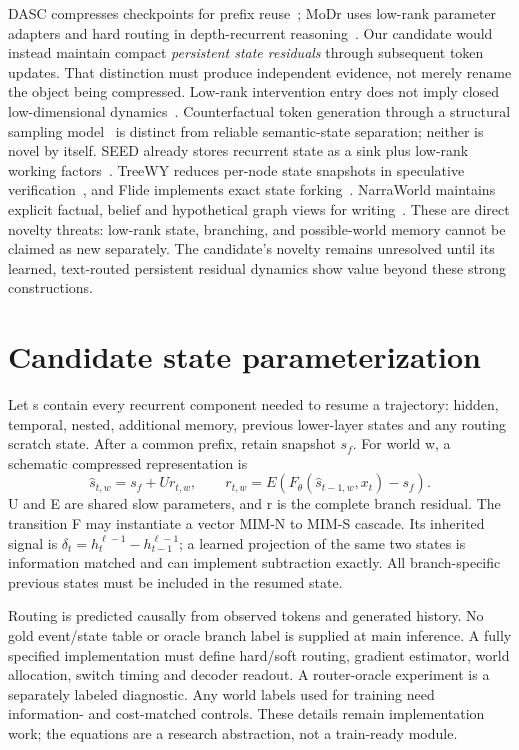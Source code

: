 \documentclass[11pt,a4paper]{article}
\begin{document}
DASC compresses checkpoints for prefix reuse~\cite{dasc}; MoDr uses low-rank
parameter adapters and hard routing in depth-recurrent reasoning~\cite{modr}.
Our candidate would instead maintain compact \emph{persistent state residuals}
through subsequent token updates. That distinction must produce independent
evidence, not merely rename the object being compressed. Low-rank intervention
entry does not imply closed low-dimensional dynamics~\cite{lowrank}.
Counterfactual token generation through a structural sampling model~\cite{cftokens}
is distinct from reliable semantic-state separation; neither is novel by itself.
SEED already stores recurrent state as a sink plus low-rank working
factors~\cite{seed}. TreeWY reduces per-node state snapshots in speculative
verification~\cite{treewy}, and Flide implements exact state forking~\cite{flide}.
NarraWorld maintains explicit factual, belief and hypothetical graph views
for writing~\cite{narraworld}. These are direct novelty threats: low-rank
state, branching, and possible-world memory cannot be claimed as new separately.
The candidate's novelty remains unresolved until its learned, text-routed
persistent residual dynamics show value beyond these strong constructions.

\section{Candidate state parameterization}
Let s contain every recurrent component needed to resume a trajectory: hidden,
temporal, nested, additional memory, previous lower-layer states and any routing
scratch state. After a common prefix, retain snapshot \(s_f\). For world w, a
schematic compressed representation is
\[
\hat s_{t,w}=s_f+Ur_{t,w},\qquad
r_{t,w}=E\left(F_\theta(\hat s_{t-1,w},x_t)-s_f\right).
\]
U and E are shared slow parameters, and r is the complete branch residual.
The transition F may instantiate a vector MIM-N to MIM-S cascade. Its inherited
signal is \(\delta_t=h_t^{\ell-1}-h_{t-1}^{\ell-1}\); a learned projection of the
same two states is information matched and can implement subtraction exactly.
All branch-specific previous states must be included in the resumed state.

Routing is predicted causally from observed tokens and generated history.
No gold event/state table or oracle branch label is supplied at main inference.
A fully specified implementation must define hard/soft routing, gradient estimator,
world allocation, switch timing and decoder readout. A router-oracle experiment
is a separately labeled diagnostic. Any world labels used for training need
information- and cost-matched controls. These details remain implementation work;
the equations are a research abstraction, not a train-ready module.
\end{document}
